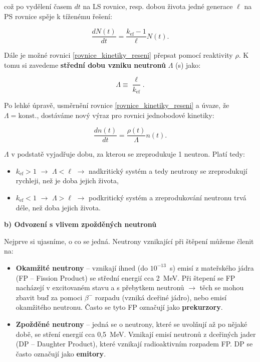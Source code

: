 což po vydělení časem $dt$ na LS rovnice, resp. dobou života jedné generace $\ell$ na PS rovnice spěje k tíženému řešení:

$$ \dfrac{dN(t)}{dt} = \dfrac{k_{\text{ef}} - 1}{\ell} N(t). $$

Dále je možné rovnici \eqref{rovnice_kinetiky_reseni} přepsat pomocí reaktivity $\rho$. K tomu si zavedeme \textbf{střední dobu vzniku neutronů} $\Lambda$ (s) jako:

\begin{equation}
  \boxed{
  \Lambda \equiv \dfrac{\ell}{k_{\text{ef}}}.
  \label{stredni_doba_vzniku}}
\end{equation}

Po lehké úpravě, usměrnění rovnice \eqref{rovnice_kinetiky_reseni} a úvaze, že $\Lambda = \text{konst.}$, dostáváme nový výraz pro rovnici jednobodové kinetiky:

\begin{equation}
  \boxed{
  \dfrac{dn(t)}{dt} = \dfrac{\rho (t)}{\Lambda} n(t).
  \label{rovnice_kinetiky_reaktivita}}
\end{equation}

$\Lambda$ v podstatě vyjadřuje dobu, za kterou se zreprodukuje 1 neutron. Platí tedy:

\begin{itemize}
  \item $k_{\text{ef}} > 1$ $\rightarrow$ $\Lambda < \ell$ $\rightarrow$ nadkritický systém a tedy neutrony se zreprodukují rychleji, než je doba jejich života,
  \item $k_{\text{ef}} < 1$ $\rightarrow$ $\Lambda > \ell$ $\rightarrow$ podkritický systém a zreprodukování neutronu trvá déle, než doba jejich života.
\end{itemize}

\textbf{b) Odvození s vlivem zpožděných neutronů}

Nejprve si ujasníme, o co se jedná. Neutrony vznikající při štěpení můžeme členit na:

\begin{itemize}
  \item \textbf{Okamžité neutrony} -- vznikají ihned (do $10^{-13}$~s) emisí z mateřského jádra (FP -- Fission Product) se střední energií cca 2~MeV. Při štepení se FP nacházejí v excitovaném stavu a s přebytkem neutronů $\rightarrow$ těch se mohou zbavit buď za pomoci $\beta^-$ rozpadu (vzniká dceřiné jádro), nebo emisí okamžitého neutronu. Často se tyto FP označují jako \textbf{prekurzory}.
  \item \textbf{Zpožděné neutrony} -- jedná se o neutrony, které se uvolňují až po nějaké době, se stření energií cca 0,5~MeV. Vznikají emisí neutronů z dceřiných jader (DP -- Daughter Product), které vznikají radioaktivním rozpadem FP. DP se často označují jako \textbf{emitory}.
\end{itemize}

